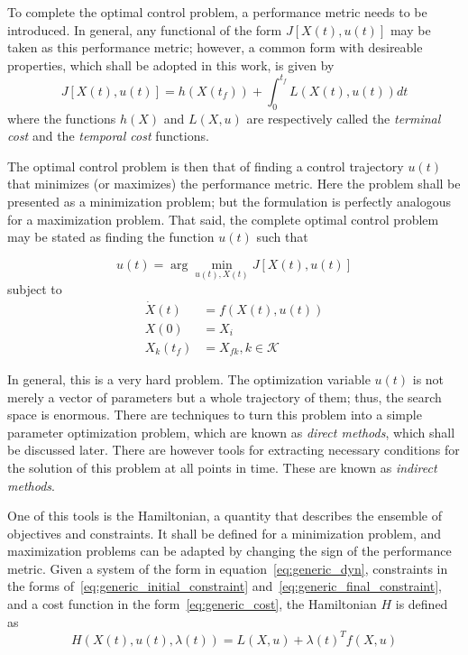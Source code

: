 To complete the optimal control problem, a performance metric needs to be introduced. In general, any functional of the form \(J[X(t), u(t)]\) may be taken as this performance metric; however, a common form with desireable properties, which shall be adopted in this work, is given by
\begin{equation} \label{eq:generic_cost}
    J[X(t), u(t)] = h(X(t_f)) + \int_0^{t_f} L(X(t), u(t)) dt
\end{equation}
where the functions \(h(X)\) and \(L(X, u)\) are respectively called the \textit{terminal cost} and the \textit{temporal cost} functions.\

The optimal control problem is then that of finding a control trajectory \(u(t)\) that minimizes (or maximizes) the performance metric. Here the problem shall be presented as a minimization problem; but the formulation is perfectly analogous for a maximization problem. That said, the complete optimal control problem may be stated as finding the function \(u(t)\) such that

\begin{equation} \label{eq:argmin_cost}
    u(t) = \arg \min_{u(t), X(t)} J[X(t), u(t)]
\end{equation}
subject to
\begin{align}
    \dot X(t) &= f(X(t), u(t)) \\
    X(0) &= X_i \\
    X_k(t_f) &= X_{fk}, k\in \mathcal{K}
\end{align}

In general, this is a very hard problem. The optimization variable \(u(t)\) is not merely a vector of parameters but a whole trajectory of them; thus, the search space is enormous. There are techniques to turn this problem into a simple parameter optimization problem, which are known as \textit{direct methods}, which shall be discussed later. There are however tools for extracting necessary conditions for the solution of this problem at all points in time. These are known as \textit{indirect methods}.

One of this tools is the Hamiltonian, a quantity that describes the ensemble of objectives and constraints. It shall be defined for a minimization problem, and maximization problems can be adapted by changing the sign of the performance metric. Given a system of the form in equation~\eqref{eq:generic_dyn}, constraints in the forms of~\eqref{eq:generic_initial_constraint} and~\eqref{eq:generic_final_constraint}, and a cost function in the form~\eqref{eq:generic_cost}, the Hamiltonian \(H\) is defined as~\cite{bertsekas}
\begin{equation}
    H(X(t), u(t), \lambda(t)) = L(X, u) + \lambda{(t)}^T f(X, u)
\end{equation}

